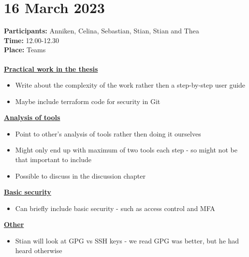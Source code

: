 \section{16 March 2023}
\textbf{Participants:} Anniken, Celina, Sebastian, Stian, Stian and Thea\\
\textbf{Time:} 12.00-12.30 \\
\textbf{Place:} Teams
\\~\\
\textbf{\underline{Practical work in the thesis}}
\begin{itemize}
    \item Write about the complexity of the work rather then a step-by-step user guide
    \item Maybe include terraform code for security in Git
\end{itemize}

\textbf{\underline{Analysis of tools}}
\begin{itemize}
    \item Point to other's analysis of tools rather then doing it ourselves
    \item Might only end up with maximum of two tools each step - so might not be that important to include
    \item Possible to discuss in the discussion chapter
\end{itemize}

\textbf{\underline{Basic security}}
\begin{itemize}
    \item Can briefly include basic security - such as access control and MFA
\end{itemize}

\textbf{\underline{Other}}
\begin{itemize}
    \item Stian will look at GPG vs SSH keys - we read GPG was better, but he had heard otherwise
\end{itemize}

